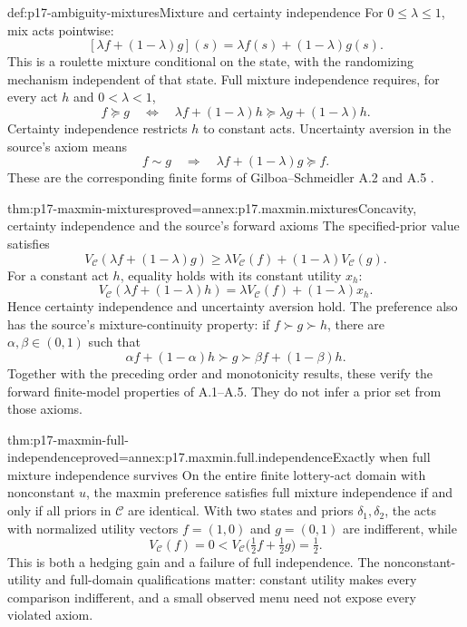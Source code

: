\begin{hbdefinition}{def:p17-ambiguity-mixtures}{Mixture and certainty independence}
For \(0\leq\lambda\leq1\), mix acts pointwise:
\[
           [\lambda f+(1-\lambda)g](s)
                        =\lambda f(s)+(1-\lambda)g(s).
\]
This is a roulette mixture conditional on the state, with
the randomizing mechanism independent of that state.
Full mixture independence requires, for every act \(h\)
and \(0<\lambda<1\),
\[
 f\succeq g\quad\Longleftrightarrow\quad
 \lambda f+(1-\lambda)h
                  \succeq\lambda g+(1-\lambda)h.
\]
Certainty independence restricts \(h\) to constant acts.
Uncertainty aversion in the source's axiom means
\[
 f\sim g\quad\Longrightarrow\quad
                       \lambda f+(1-\lambda)g\succeq f .
\]
These are the corresponding finite forms of
Gilboa--Schmeidler A.2 and A.5
\cite[pp.~144--145]{GilboaSchmeidler1989Maxmin}.
\end{hbdefinition}

\begin{hbtheorem}{thm:p17-maxmin-mixtures}{proved=annex:p17.maxmin.mixtures}{Concavity, certainty independence and the source's forward axioms}
The specified-prior value satisfies
\[
 V_{\mathcal C}(\lambda f+(1-\lambda)g)
           \geq\lambda V_{\mathcal C}(f)+(1-\lambda)V_{\mathcal C}(g).
\]
For a constant act \(h\), equality holds with its constant
utility \(x_h\):
\[
 V_{\mathcal C}(\lambda f+(1-\lambda)h)
                         =\lambda V_{\mathcal C}(f)+(1-\lambda)x_h.
\]
Hence certainty independence and uncertainty aversion hold.
The preference also has the source's mixture-continuity property:
if \(f\succ g\succ h\), there are \(\alpha,\beta\in(0,1)\)
such that
\[
       \alpha f+(1-\alpha)h\succ g
                              \succ\beta f+(1-\beta)h.
\]
Together with the preceding order and monotonicity results,
these verify the forward finite-model properties of A.1--A.5.
They do not infer a prior set from those axioms.
\end{hbtheorem}

\begin{hbtheorem}{thm:p17-maxmin-full-independence}{proved=annex:p17.maxmin.full.independence}{Exactly when full mixture independence survives}
On the entire finite lottery-act domain with nonconstant \(u\),
the maxmin preference satisfies full mixture independence
if and only if all priors in \(\mathcal C\) are identical.
With two states and priors \(\delta_1,\delta_2\),
the acts with normalized utility vectors
\(f=(1,0)\) and \(g=(0,1)\) are indifferent, while
\[
                V_{\mathcal C}(f)=0
                   <V_{\mathcal C}\bigl(\tfrac12f+\tfrac12g\bigr)=\tfrac12.
\]
This is both a hedging gain and a failure of full independence.
The nonconstant-utility and full-domain qualifications matter:
constant utility makes every comparison indifferent, and a
small observed menu need not expose every violated axiom.
\end{hbtheorem}

